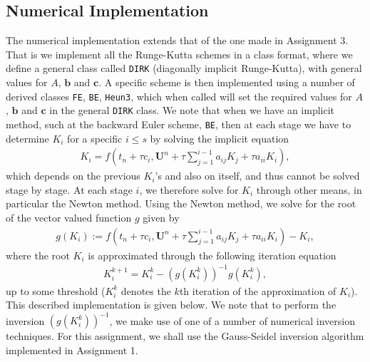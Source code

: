\documentclass[a4paper,11pt]{article}
\theoremstyle{break}
\theoremstyle{break2}
\theoremstyle{break}
\theoremstyle{break2}
\begin{document}
\subsection{Numerical Implementation}
The numerical implementation extends that of the one made in Assignment 3. That is we implement all the Runge-Kutta schemes in a class format, where we define a general class called \texttt{DIRK} (diagonally implicit Runge-Kutta), with general values for $ A $, $ \mathbf{b} $ and $ \mathbf{c} $. A specific scheme is then implemented using a number of derived classes \texttt{FE}, \texttt{BE}, \texttt{Heun3}, which when called will set the required values for $ A $, $ \mathbf{b} $ and $ \mathbf{c} $ in the general \texttt{DIRK} class. We note that when we have an implicit method, such at the backward Euler scheme, \texttt{BE}, then at each stage we have to determine $ K_i $ for a specific $ i \leq s $ by solving the implicit equation
\begin{align*}
K_i = f\left(t_n + \tau c_i, \mathbf{U}^n + \tau\sum_{j=1}^{i-1}a_{ij}K_j + \tau a_{ii}K_i\right),
\end{align*}
which depends on the previous $ K_i $'s and also on itself, and thus cannot be solved stage by stage. At each stage $ i $, we therefore solve for $ K_i $ through other means, in particular the Newton method. Using the Newton method, we solve for the root of the vector valued function $ g $ given by
\begin{align*}
g(K_i) := f\left(t_n + \tau c_i, \mathbf{U}^n + \tau\sum_{j=1}^{i-1}a_{ij}K_j + \tau a_{ii}K_i\right) - K_i,
\end{align*}
where the root $ K_i $ is approximated through the following iteration equation
\begin{align*}
K_i^{k+1} = K_i^{k} - (g(K_{i}^{k}))^{-1}g(K_{i}^{k}),
\end{align*}
up to some threshold ($ K_i^k $ denotes the $ k $th iteration of the approximation of $ K_i $). This described implementation is given below. We note that to perform the inversion $ (g(K_{i}^{k}))^{-1} $, we make use of one of a number of numerical inversion techniques. For this assignment, we shall use the Gauss-Seidel inversion algorithm implemented in Assignment 1.
\end{document}
